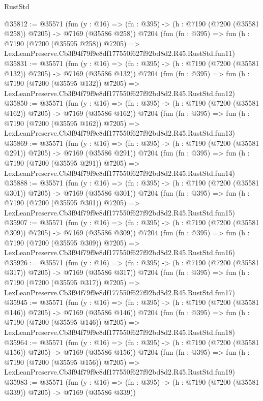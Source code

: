 \begin{lexlean}{RustStd}
\begin{coremodule}
@35812 := @35571
    (fun (y : @16) => (fn : @395) -> (h : @7190 (@7200 (@35581 @258)) @7205) -> @7169 (@35586 @258))
    @7204
    (fun (fn : @395) =>
    fun (h : @7190 (@7200 (@35595 @258)) @7205) =>
    LexLeanPreserve.Cb3f94f79f9e8df177550f627f92bd8d2.R45.RustStd.fun11)
@35831 := @35571
    (fun (y : @16) => (fn : @395) -> (h : @7190 (@7200 (@35581 @132)) @7205) -> @7169 (@35586 @132))
    @7204
    (fun (fn : @395) =>
    fun (h : @7190 (@7200 (@35595 @132)) @7205) =>
    LexLeanPreserve.Cb3f94f79f9e8df177550f627f92bd8d2.R45.RustStd.fun12)
@35850 := @35571
    (fun (y : @16) => (fn : @395) -> (h : @7190 (@7200 (@35581 @162)) @7205) -> @7169 (@35586 @162))
    @7204
    (fun (fn : @395) =>
    fun (h : @7190 (@7200 (@35595 @162)) @7205) =>
    LexLeanPreserve.Cb3f94f79f9e8df177550f627f92bd8d2.R45.RustStd.fun13)
@35869 := @35571
    (fun (y : @16) => (fn : @395) -> (h : @7190 (@7200 (@35581 @291)) @7205) -> @7169 (@35586 @291))
    @7204
    (fun (fn : @395) =>
    fun (h : @7190 (@7200 (@35595 @291)) @7205) =>
    LexLeanPreserve.Cb3f94f79f9e8df177550f627f92bd8d2.R45.RustStd.fun14)
@35888 := @35571
    (fun (y : @16) => (fn : @395) -> (h : @7190 (@7200 (@35581 @301)) @7205) -> @7169 (@35586 @301))
    @7204
    (fun (fn : @395) =>
    fun (h : @7190 (@7200 (@35595 @301)) @7205) =>
    LexLeanPreserve.Cb3f94f79f9e8df177550f627f92bd8d2.R45.RustStd.fun15)
@35907 := @35571
    (fun (y : @16) => (fn : @395) -> (h : @7190 (@7200 (@35581 @309)) @7205) -> @7169 (@35586 @309))
    @7204
    (fun (fn : @395) =>
    fun (h : @7190 (@7200 (@35595 @309)) @7205) =>
    LexLeanPreserve.Cb3f94f79f9e8df177550f627f92bd8d2.R45.RustStd.fun16)
@35926 := @35571
    (fun (y : @16) => (fn : @395) -> (h : @7190 (@7200 (@35581 @317)) @7205) -> @7169 (@35586 @317))
    @7204
    (fun (fn : @395) =>
    fun (h : @7190 (@7200 (@35595 @317)) @7205) =>
    LexLeanPreserve.Cb3f94f79f9e8df177550f627f92bd8d2.R45.RustStd.fun17)
@35945 := @35571
    (fun (y : @16) => (fn : @395) -> (h : @7190 (@7200 (@35581 @146)) @7205) -> @7169 (@35586 @146))
    @7204
    (fun (fn : @395) =>
    fun (h : @7190 (@7200 (@35595 @146)) @7205) =>
    LexLeanPreserve.Cb3f94f79f9e8df177550f627f92bd8d2.R45.RustStd.fun18)
@35964 := @35571
    (fun (y : @16) => (fn : @395) -> (h : @7190 (@7200 (@35581 @156)) @7205) -> @7169 (@35586 @156))
    @7204
    (fun (fn : @395) =>
    fun (h : @7190 (@7200 (@35595 @156)) @7205) =>
    LexLeanPreserve.Cb3f94f79f9e8df177550f627f92bd8d2.R45.RustStd.fun19)
@35983 := @35571
    (fun (y : @16) => (fn : @395) -> (h : @7190 (@7200 (@35581 @339)) @7205) -> @7169 (@35586 @339))

\end{coremodule}
\end{lexlean}
